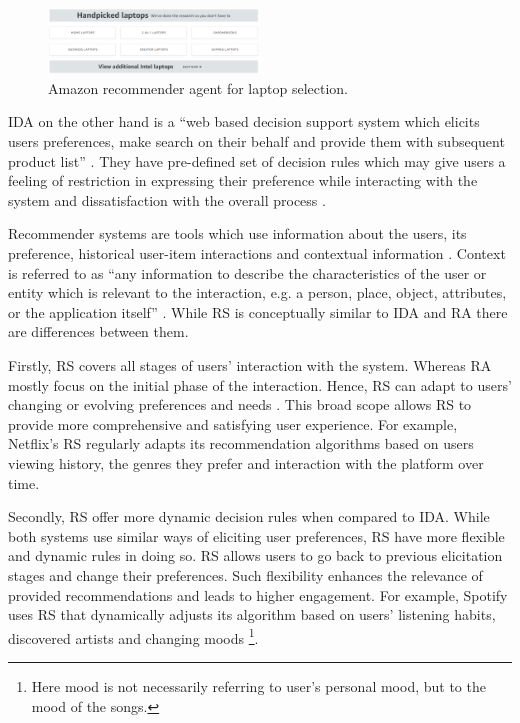 \documentclass[a4paper,12pt]{article}
\begin{document}
\begin{figure}[H]
    \centering
    \includegraphics[width=0.5\textwidth]{staticFiles/amazonLaptopHandpicked.PNG}
    \caption{Amazon recommender agent for laptop selection.}
    \label{fig:amazonRA}
\end{figure}

IDA on the other hand is a ``web based decision support system which elicits users preferences, make search on their behalf and provide them with subsequent product list'' \citep{maes1999agents}. They have pre-defined set of decision rules which may give users a feeling of restriction in expressing their preference while interacting with the system and dissatisfaction with the overall process \citep{wang2009interactive, silver1988user}.

Recommender systems are tools which use information about the users, its preference, historical user-item interactions and contextual information \citep{adomavicius2005toward}. Context is referred to as ``any information to describe the characteristics of the user or entity which is relevant to the interaction, e.g. a person, place, object, attributes, or the application itself'' \citep{dey2001understanding}.  While RS is conceptually similar to IDA and RA there are differences between them.

Firstly, RS covers all stages of users' interaction with the system. Whereas RA mostly focus on the initial phase of the interaction. Hence, RS can adapt to users' changing or evolving preferences and needs \citep{songWhenHowDiversify2019}. This broad scope allows RS to provide more comprehensive and satisfying user experience. For example, Netflix's RS regularly adapts its recommendation algorithms based on users viewing history, the genres they prefer and interaction with the platform over time.  

Secondly, RS offer more dynamic decision rules when compared to IDA. While both systems use similar ways of eliciting user preferences, RS have more flexible and dynamic rules in doing so. RS allows users to go back to previous elicitation stages and change their preferences. Such flexibility enhances the relevance of provided recommendations and leads to higher engagement. For example, Spotify uses RS that dynamically adjusts its algorithm based on users' listening habits, discovered artists and changing moods \footnote{Here mood is not necessarily referring to user's personal mood, but to the mood of the songs.}. 
\end{document}
